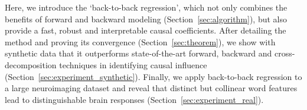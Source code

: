 Here, we introduce the `back-to-back regression', which not only combines the benefits of forward and backward modeling (Section~\ref{sec:algorithm}), but also provide a fast, robust and interpretable causal coefficients. After detailing the method and proving its convergence (Section~\ref{sec:theorem}), we show with synthetic data that it outperforms state-of-the-art forward, backward and cross-decomposition techniques in identifying causal influence (Section~\ref{sec:experiment_synthetic}). Finally, we apply back-to-back regression to a large neuroimaging dataset and reveal that distinct but collinear word features lead to distinguishable brain responses (Section~\ref{sec:experiment_real}).

